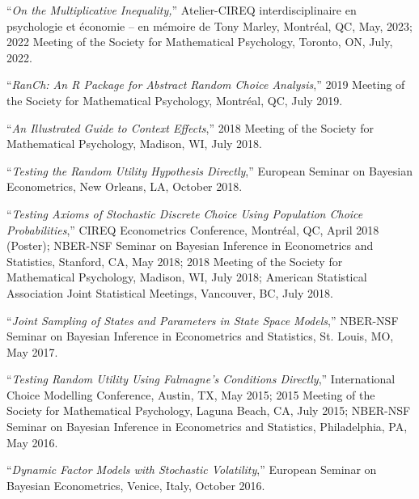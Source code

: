 \documentclass[12pt]{article}
\begin{document}
``{\it On the Multiplicative Inequality,}''
Atelier-CIREQ interdisciplinaire en psychologie et économie – en mémoire de Tony Marley,
Montr\'eal, QC,
May, 2023;
2022 Meeting of the Society for Mathematical Psychology,
Toronto, ON,
July, 2022.

``{\it RanCh: An R Package for Abstract Random Choice Analysis},''
2019 Meeting of the Society for Mathematical Psychology,
Montr\'eal, QC,
July 2019.

``{\it An Illustrated Guide to Context Effects},''
2018 Meeting of the Society for Mathematical Psychology,
Madison, WI,
July 2018.

``{\it Testing the Random Utility Hypothesis Directly},''
European Seminar on Bayesian Econometrics,
New Orleans, LA,
October 2018.

``{\it Testing Axioms of Stochastic Discrete Choice Using Population Choice Probabilities},''
CIREQ Econometrics Conference,
Montr\'eal, QC,
April 2018 (Poster);
NBER-NSF Seminar on Bayesian Inference in Econometrics and Statistics,
Stanford, CA,
May 2018;
2018 Meeting of the Society for Mathematical Psychology,
Madison, WI,
July 2018;
American Statistical Association Joint Statistical Meetings,
Vancouver, BC,
July 2018.

``{\it Joint Sampling of States and Parameters in State Space Models},''
NBER-NSF Seminar on Bayesian Inference in Econometrics and Statistics,
St. Louis, MO,
May 2017.

``{\it Testing Random Utility Using Falmagne's Conditions Directly},''
International Choice Modelling Conference,
Austin, TX,
May 2015;
2015 Meeting of the Society for Mathematical Psychology,
Laguna Beach, CA,
July 2015;
NBER-NSF Seminar on Bayesian Inference in Econometrics and Statistics,
Philadelphia, PA,
May 2016.

``{\it Dynamic Factor Models with Stochastic Volatility},''
European Seminar on Bayesian Econometrics,
Venice, Italy,
October 2016.

\end{document}
